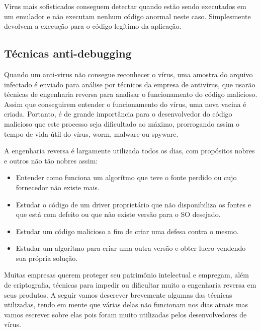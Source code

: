 Vírus mais sofisticados conseguem detectar quando estão sendo executados em um emulador e não executam nenhum código anormal neste caso. Simplesmente devolvem a execução para o código legítimo da aplicação.

\subsection{Técnicas anti-debugging} 
Quando um anti-virus não consegue reconhecer o vírus, uma amostra do arquivo infectado é enviado para análise por técnicos da empresa de antivírus, que usarão técnicas de engenharia reversa para analisar o funcionamento do código malicioso. Assim que conseguirem entender o funcionamento do vírus, uma nova vacina é criada. Portanto, é de grande importância para o desenvolvedor do código malicioso que este processo seja dificultado ao máximo, prorrogando assim o tempo de vida útil do vírus, worm, malware ou spyware. 

A engenharia reversa é largamente utilizada todos os dias, com propósitos nobres e outros não tão nobres assim:
\begin{itemize}
 \item Entender como funciona um algorítmo que teve o fonte perdido ou cujo fornecedor não existe mais.
 \item Estudar o código de um driver proprietário que não disponibiliza os fontes e que está com defeito ou que não existe versão para o SO desejado. 
 \item Estudar um código malicioso a fim de criar uma defesa contra o mesmo.
 \item Estudar um algorítmo para criar uma outra versão e obter lucro vendendo sua própria solução.
\end{itemize}

Muitas empresas querem proteger seu patrimônio intelectual e empregam, além de criptografia, técnicas para impedir ou dificultar muito a engenharia reversa em seus produtos. A seguir vamos descrever brevemente algumas das técnicas utilizadas, tendo em mente que várias delas não funcionam nos dias atuais mas vamos escrever sobre elas pois foram muito utilizadas pelos desenvolvedores de vírus. 

